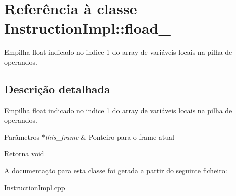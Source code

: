\hypertarget{class_instruction_impl_1_1fload__1}{}\section{Referência à classe Instruction\+Impl\+:\+:fload\+\_}
\label{class_instruction_impl_1_1fload__1}


Empilha float indicado no indice 1 do array de variáveis locais na pilha de operandos.  




\subsection{Descrição detalhada}
Empilha float indicado no indice 1 do array de variáveis locais na pilha de operandos. 


\begin{DoxyParams}{Parâmetros}
{\em $\ast$this\+\_\+frame} & Ponteiro para o frame atual \\
\hline
\end{DoxyParams}
\begin{DoxyReturn}{Retorna}
void 
\end{DoxyReturn}


A documentação para esta classe foi gerada a partir do seguinte ficheiro\+:\begin{DoxyCompactItemize}
\item 
\hyperlink{_instruction_impl_8cpp}{Instruction\+Impl.\+cpp}\end{DoxyCompactItemize}
